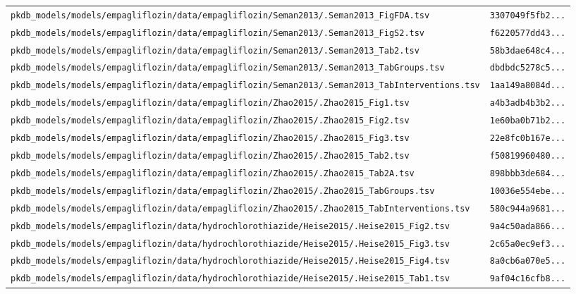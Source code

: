 \documentclass{article}
\begin{document}
\begin{longtable}{ll}
\texttt{pkdb\_models/models/empagliflozin/data/empagliflozin/Seman2013/.Seman2013\_FigFDA.tsv} & \texttt{3307049f5fb2...} \\
\texttt{pkdb\_models/models/empagliflozin/data/empagliflozin/Seman2013/.Seman2013\_FigS2.tsv} & \texttt{f6220577dd43...} \\
\texttt{pkdb\_models/models/empagliflozin/data/empagliflozin/Seman2013/.Seman2013\_Tab2.tsv} & \texttt{58b3dae648c4...} \\
\texttt{pkdb\_models/models/empagliflozin/data/empagliflozin/Seman2013/.Seman2013\_TabGroups.tsv} & \texttt{dbdbdc5278c5...} \\
\texttt{pkdb\_models/models/empagliflozin/data/empagliflozin/Seman2013/.Seman2013\_TabInterventions.tsv} & \texttt{1aa149a8084d...} \\
\texttt{pkdb\_models/models/empagliflozin/data/empagliflozin/Zhao2015/.Zhao2015\_Fig1.tsv} & \texttt{a4b3adb4b3b2...} \\
\texttt{pkdb\_models/models/empagliflozin/data/empagliflozin/Zhao2015/.Zhao2015\_Fig2.tsv} & \texttt{1e60ba0b71b2...} \\
\texttt{pkdb\_models/models/empagliflozin/data/empagliflozin/Zhao2015/.Zhao2015\_Fig3.tsv} & \texttt{22e8fc0b167e...} \\
\texttt{pkdb\_models/models/empagliflozin/data/empagliflozin/Zhao2015/.Zhao2015\_Tab2.tsv} & \texttt{f50819960480...} \\
\texttt{pkdb\_models/models/empagliflozin/data/empagliflozin/Zhao2015/.Zhao2015\_Tab2A.tsv} & \texttt{898bbb3de684...} \\
\texttt{pkdb\_models/models/empagliflozin/data/empagliflozin/Zhao2015/.Zhao2015\_TabGroups.tsv} & \texttt{10036e554ebe...} \\
\texttt{pkdb\_models/models/empagliflozin/data/empagliflozin/Zhao2015/.Zhao2015\_TabInterventions.tsv} & \texttt{580c944a9681...} \\
\texttt{pkdb\_models/models/empagliflozin/data/hydrochlorothiazide/Heise2015/.Heise2015\_Fig2.tsv} & \texttt{9a4c50ada866...} \\
\texttt{pkdb\_models/models/empagliflozin/data/hydrochlorothiazide/Heise2015/.Heise2015\_Fig3.tsv} & \texttt{2c65a0ec9ef3...} \\
\texttt{pkdb\_models/models/empagliflozin/data/hydrochlorothiazide/Heise2015/.Heise2015\_Fig4.tsv} & \texttt{8a0cb6a070e5...} \\
\texttt{pkdb\_models/models/empagliflozin/data/hydrochlorothiazide/Heise2015/.Heise2015\_Tab1.tsv} & \texttt{9af04c16cfb8...} \\

\end{longtable}
\end{document}
